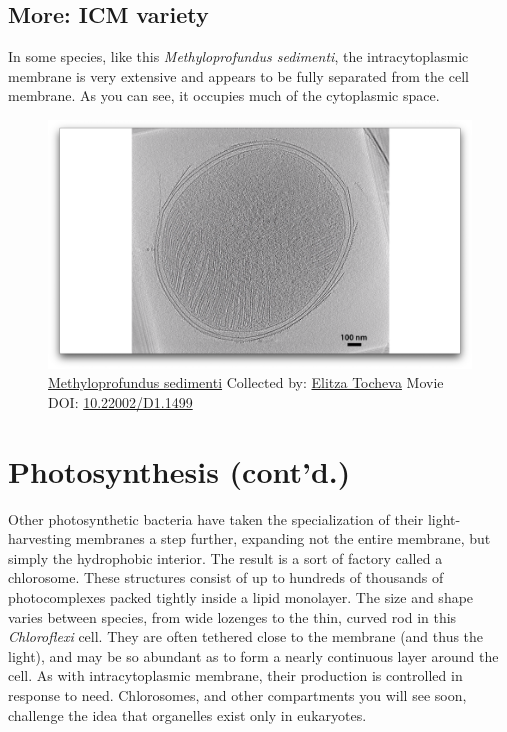 \documentclass[]{tufte-book}
\begin{document}
\hypertarget{ICM_variety}{\subsection*{More: ICM
variety}\label{ICM_variety}}

In some species, like this \emph{Methyloprofundus sedimenti}, the
intracytoplasmic membrane is very extensive and appears to be fully
separated from the cell membrane. As you can see, it occupies much of
the cytoplasmic space.





\begin{figure}
\includegraphics{movie_stills/4_3a} \caption[\protect\hyperlink{tree}{Methyloprofundus sedimenti}
Collected by: \protect\hyperlink{elitza_tocheva}{Elitza Tocheva} Movie
DOI: \href{https://doi.org/10.22002/D1.1499}{10.22002/D1.1499}]{\protect\hyperlink{tree}{Methyloprofundus sedimenti}
Collected by: \protect\hyperlink{elitza_tocheva}{Elitza Tocheva} Movie
DOI: \href{https://doi.org/10.22002/D1.1499}{10.22002/D1.1499}}\label{fig:4-3a}
\end{figure}

\section{Photosynthesis (cont'd.)}\label{photosynthesis-contd.}

Other photosynthetic bacteria have taken the specialization of their
light-harvesting membranes a step further, expanding not the entire
membrane, but simply the hydrophobic interior. The result is a sort of
factory called a chlorosome. These structures consist of up to hundreds
of thousands of photocomplexes packed tightly inside a lipid monolayer.
The size and shape varies between species, from wide lozenges to the
thin, curved rod in this \emph{Chloroflexi} cell. They are often
tethered close to the membrane (and thus the light), and may be so
abundant as to form a nearly continuous layer around the cell. As with
intracytoplasmic membrane, their production is controlled in response to
need. Chlorosomes, and other compartments you will see soon, challenge
the idea that organelles exist only in eukaryotes.
\end{document}
